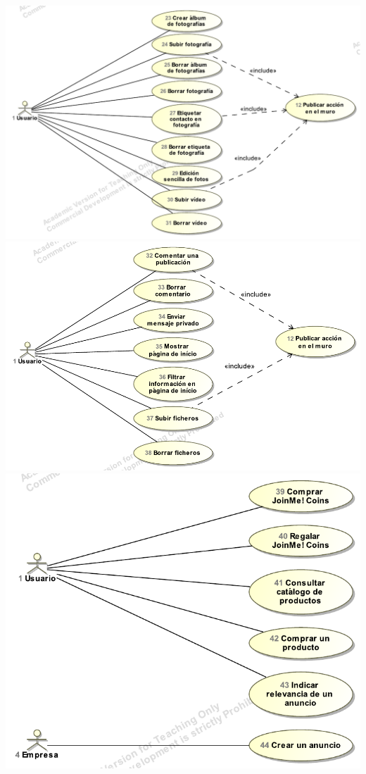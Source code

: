 \documentclass[12pt, a4paper, titlepage]{article}
\begin{document}
\includegraphics[width=\textwidth]{Imagenes/casosUso4}
\includegraphics[width=\textwidth]{Imagenes/casosUso5}
\includegraphics[width=\textwidth]{Imagenes/casosUso6}
\end{document}
